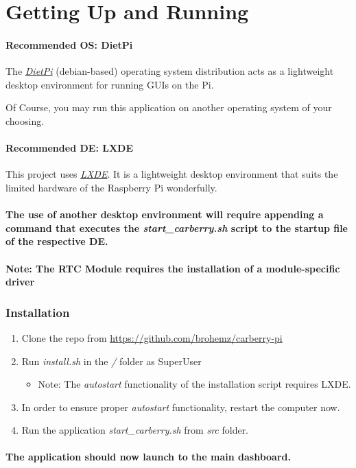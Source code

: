 \documentclass{article}
\numberwithin{figure}{section}
\begin{document}
\hypertarget{getting-up-and-running}{%
\section{Getting Up and Running}\label{getting-up-and-running}}



\hypertarget{recommended-os-dietpi}{%
\paragraph{Recommended OS: DietPi}\label{recommended-os-dietpi}}

The \href{https://dietpi.com}{\emph{DietPi}} (debian-based) operating system distribution acts as a
lightweight desktop environment for running GUIs on the Pi.

\begin{flushleft}
Of Course, you may run this application on another operating system of
your choosing.
\end{flushleft}



\hypertarget{recommended-de-lxde}{%
\paragraph{Recommended DE: LXDE}\label{recommended-de-lxde}}
This project uses \href{https://wiki.lxde.org/en/Main_Page}{\emph{LXDE}}. It is a lightweight desktop environment
that suits the limited hardware of the Raspberry Pi wonderfully.


\paragraph{The use of another desktop environment will require appending a
command that executes the \emph{start\_carberry.sh} script to the
startup file of the respective DE.}

\paragraph{Note: The RTC Module requires the installation of a module-specific driver}

\subsubsection{Installation}
\begin{enumerate}
    \def\labelenumi{\arabic{enumi}.}
    \item   Clone the repo from \url{https://github.com/brohemz/carberry-pi}
    \item   Run \emph{install.sh} in the \emph{/} folder as SuperUser
    \begin{itemize}
        \item Note: The \emph{autostart} functionality of the installation script
                    requires LXDE.
    \end{itemize}
    \item In order to ensure proper \emph{autostart} functionality, restart the computer now.
    \item Run the application \emph{start\_carberry.sh} from \emph{src} folder.
\end{enumerate}
\paragraph{The application should now launch to the main dashboard.}
\end{document}
